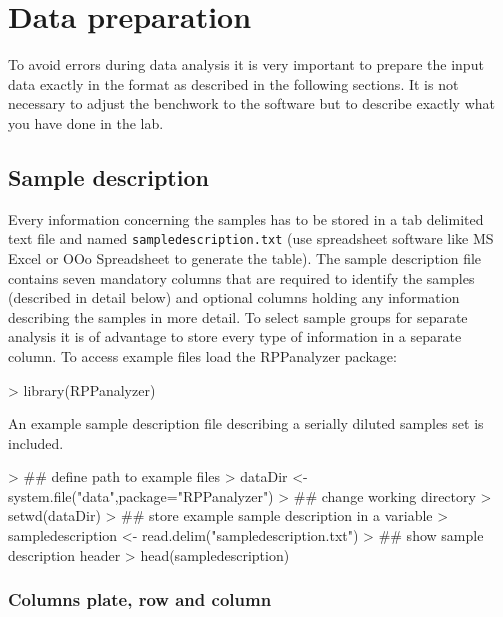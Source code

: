 \documentclass[12pt]{article}
\begin{document}
\section{Data preparation}

To avoid errors during data analysis it is very important to prepare the input data
exactly in the format as described in the following sections. It is not necessary to adjust the
benchwork to the software but to describe exactly what you have done in the lab.


\subsection{Sample description}

Every information concerning the samples has to be stored in a tab delimited
text file and named \texttt{sampledescription.txt} (use spreadsheet software like MS Excel or OOo Spreadsheet to generate the table).
The sample description file contains seven
mandatory columns that are required to identify the samples (described in detail below) and optional columns holding
any information describing the samples in more detail. To select sample groups for
separate analysis it is of advantage to store every type of information in a separate
column. To access example files load the RPPanalyzer package:

\begin{Schunk}
\begin{Sinput}
> library(RPPanalyzer)
\end{Sinput}
\end{Schunk}

An example sample description file describing a serially diluted samples set
is included.

\begin{Schunk}
\begin{Sinput}
> ## define path to example files
> dataDir <- system.file("data",package="RPPanalyzer")
> ## change working directory
> setwd(dataDir)
> ## store example sample description in a variable
> sampledescription <- read.delim("sampledescription.txt")
> ## show sample description header
> head(sampledescription)
\end{Sinput}
\end{Schunk}


\subsubsection{Columns plate, row and column}
\end{document}
